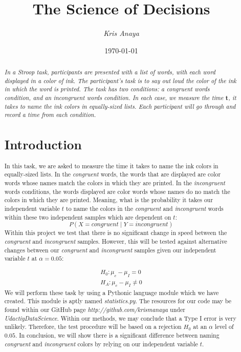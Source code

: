 \documentclass[8pt]{article}
\newcommand{\8}{\bar}
\begin{document}
 
\title{The Science of Decisions} 
\author{\textit{Kris Anaya}}
\date{\today} 
\maketitle

\begin{abstract} 
\textit{In a Stroop task, participants are presented with a list of words, with each word displayed in a color of ink. The participant's task is to say out loud the color of the ink in which the word is printed. The task has two conditions: a congruent words condition, and an incongruent words condition. In each case, we measure the time $\textbf{t}$, it takes to name the ink colors in equally-sized lists. Each participant will go through and record a time from each condition.} 
\section{Introduction}
In this task, we are asked to measure the time it takes to name the ink colors in equally-sized lists. In the \textit{congruent} words, the words that are displayed are color words whose names match the colors in which they are printed. In the \textit{incongruent} words conditions, the words displayed are color words whose names do no match the colors in which they are printed. Meaning, what is the probability it takes our independent variable $t$ to name the colors in the \textit{congruent} and \textit{incongruent} words within these two independent samples which are dependent on $t$: 
\begin{equation} 
P(X = congruent \mid Y = incongruent) 
\end{equation} 
Within this project we test that there is no significant change in speed between the  \textit{congruent} and \textit{incongruent} samples. However, this will be tested against alternative changes between our \textit{congruent} and \textit{incongruent} samples given our independent variable $t$ at $\alpha = 0.05$: 

\begin{equation}
\begin{split}
H_{0}: \mu_{c}-\mu_{I} = 0 \\
H_{A}: \mu_{c}-\mu_{I} \not= 0 
\end{split}
\end{equation}
We will perform these task by using a Pythonic language module which we have created. This module is aptly named \textit{statistics.py}. 
The resources for our code may be found within our GitHub page \textit{http://github.com/krismanaya} under \textit{UdactiyDataScience}. Within our methods, we may conclude that a Type I error is very unlikely. Therefore, the test procedure will be based on a rejection $H_{0}$ at an $\alpha$ level of $0.05$. In conclusion, we will show there is a significant difference between naming \textit{congruent} and \textit{incongruent} colors by relying on our independent variable $t$. 
\newpage

\end{abstract}
\end{document}
